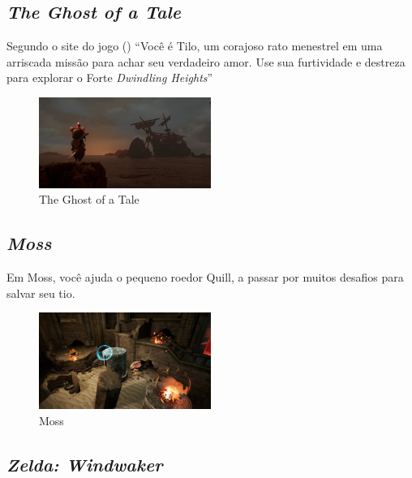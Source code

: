 \subsection{\textit{The Ghost of a Tale}} Segundo o site do jogo (\citeyear{Ghostofa36:online})  ``Você é Tilo,
um corajoso rato menestrel em uma arriscada missão para achar seu verdadeiro
amor. Use sua furtividade e destreza para explorar o Forte \textit{Dwindling
Heights}''

\begin{figure}[!htb] \caption{\label{tale}The Ghost of a Tale} \begin{center}
\includegraphics[width=0.5\textwidth]{imagens/tale.jpg} \end{center}
 \end{figure}

\subsection{\textit{Moss}}
Em Moss, você ajuda o pequeno roedor Quill, a passar por muitos desafios para salvar seu tio. \cite{Moss18}

\begin{figure}[!htb] \caption{\label{fig_moss}Moss} \begin{center}
\includegraphics[width=0.5\textwidth]{imagens/moss.jpg} \end{center}
 \end{figure}


\subsection{\textit{Zelda: Windwaker}}

